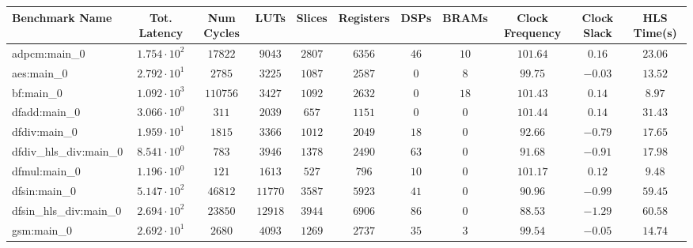 \begin{tabular}{|l|c|c|c|c|c|c|c|c|c|c|}
\hline
Benchmark Name          & Tot. Latency           & Num Cycles & LUTs      & Slices    & Registers & DSPs    & BRAMs   & Clock Frequency & Clock Slack & HLS Time(s) \\
\hline
adpcm:main\_0           & $ 1.754 \cdot 10^{2} $ & $ 17822  $ & $ 9043  $ & $ 2807  $ & $ 6356  $ & $ 46  $ & $ 10  $ & $ 101.64      $ & $ 0.16    $ & $ 23.06   $ \\
aes:main\_0             & $ 2.792 \cdot 10^{1} $ & $ 2785   $ & $ 3225  $ & $ 1087  $ & $ 2587  $ & $ 0   $ & $ 8   $ & $ 99.75       $ & $ -0.03   $ & $ 13.52   $ \\
bf:main\_0              & $ 1.092 \cdot 10^{3} $ & $ 110756 $ & $ 3427  $ & $ 1092  $ & $ 2632  $ & $ 0   $ & $ 18  $ & $ 101.43      $ & $ 0.14    $ & $ 8.97    $ \\
dfadd:main\_0           & $ 3.066 \cdot 10^{0} $ & $ 311    $ & $ 2039  $ & $ 657   $ & $ 1151  $ & $ 0   $ & $ 0   $ & $ 101.44      $ & $ 0.14    $ & $ 31.43   $ \\
dfdiv:main\_0           & $ 1.959 \cdot 10^{1} $ & $ 1815   $ & $ 3366  $ & $ 1012  $ & $ 2049  $ & $ 18  $ & $ 0   $ & $ 92.66       $ & $ -0.79   $ & $ 17.65   $ \\
dfdiv\_hls\_div:main\_0 & $ 8.541 \cdot 10^{0} $ & $ 783    $ & $ 3946  $ & $ 1378  $ & $ 2490  $ & $ 63  $ & $ 0   $ & $ 91.68       $ & $ -0.91   $ & $ 17.98   $ \\
dfmul:main\_0           & $ 1.196 \cdot 10^{0} $ & $ 121    $ & $ 1613  $ & $ 527   $ & $ 796   $ & $ 10  $ & $ 0   $ & $ 101.17      $ & $ 0.12    $ & $ 9.48    $ \\
dfsin:main\_0           & $ 5.147 \cdot 10^{2} $ & $ 46812  $ & $ 11770 $ & $ 3587  $ & $ 5923  $ & $ 41  $ & $ 0   $ & $ 90.96       $ & $ -0.99   $ & $ 59.45   $ \\
dfsin\_hls\_div:main\_0 & $ 2.694 \cdot 10^{2} $ & $ 23850  $ & $ 12918 $ & $ 3944  $ & $ 6906  $ & $ 86  $ & $ 0   $ & $ 88.53       $ & $ -1.29   $ & $ 60.58   $ \\
gsm:main\_0             & $ 2.692 \cdot 10^{1} $ & $ 2680   $ & $ 4093  $ & $ 1269  $ & $ 2737  $ & $ 35  $ & $ 3   $ & $ 99.54       $ & $ -0.05   $ & $ 14.74   $ \\

\end{tabular}
